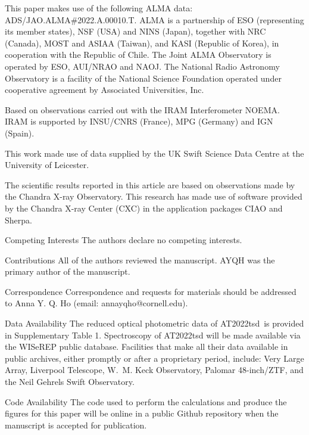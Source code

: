 \documentclass{nature_plusfigure}
\newcommand{\at}{AT2022tsd}
\begin{document}
\begin{addendum}
This paper makes use of the following ALMA data: ADS/JAO.ALMA\#2022.A.00010.T. ALMA is a partnership of ESO (representing its member states), NSF (USA) and NINS (Japan), together with NRC (Canada), MOST and ASIAA (Taiwan), and KASI (Republic of Korea), in cooperation with the Republic of Chile. The Joint ALMA Observatory is operated by ESO, AUI/NRAO and NAOJ. The National Radio Astronomy Observatory is a facility of the National Science Foundation operated under cooperative agreement by Associated Universities, Inc.

Based on observations carried out with the IRAM Interferometer NOEMA. IRAM is supported by INSU/CNRS (France), MPG (Germany) and IGN (Spain).

This work made use of data supplied by the UK Swift Science Data Centre at the University of Leicester.

The scientific results reported in this article are based on observations made by the Chandra X-ray Observatory. This research has made use of software provided by the Chandra X-ray Center (CXC) in the application packages CIAO and Sherpa.

 \item[Competing Interests] The authors declare no competing interests.

\item[Contributions] All of the authors reviewed the manuscript. AYQH was the primary author of the manuscript. %

 \item[Correspondence] Correspondence and requests for materials
should be addressed to Anna Y. Q. Ho (email: annayqho@cornell.edu).

 \item[Data Availability] The reduced optical photometric data of \at\ is provided in Supplementary Table 1. Spectroscopy of AT2022tsd will be made available via the WISeREP public database. Facilities that make all their data available in public archives, either promptly or after a proprietary period, include: Very Large Array, Liverpool Telescope, W.~M. Keck Observatory, Palomar 48-inch/ZTF, and the Neil Gehrels Swift Observatory. 
 
 \item[Code Availability] The code used to perform the calculations and produce the figures for this paper will be online in a public Github repository when the manuscript is accepted for publication.%

\end{addendum}
\end{document}
